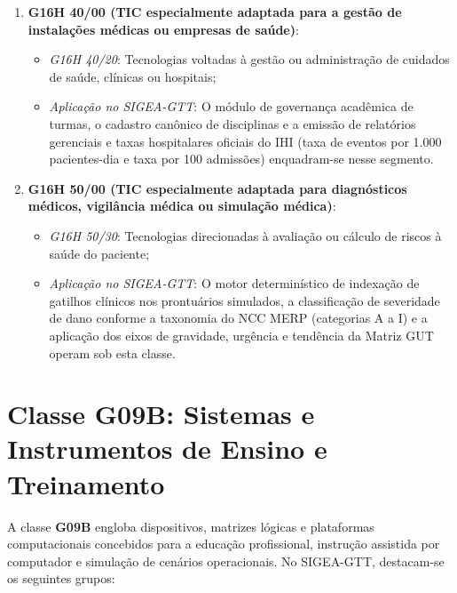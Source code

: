 \begin{enumerate}
    \item \textbf{G16H 40/00 (TIC especialmente adaptada para a gestão de instalações médicas ou empresas de saúde)}:
    \begin{itemize}
        \item \textit{G16H 40/20}: Tecnologias voltadas à gestão ou administração de cuidados de saúde, clínicas ou hospitais;
        \item \textit{Aplicação no SIGEA-GTT}: O módulo de governança acadêmica de turmas, o cadastro canônico de disciplinas e a emissão de relatórios gerenciais e taxas hospitalares oficiais do IHI (taxa de eventos por 1.000 pacientes-dia e taxa por 100 admissões) enquadram-se nesse segmento.
    \end{itemize}

    \item \textbf{G16H 50/00 (TIC especialmente adaptada para diagnósticos médicos, vigilância médica ou simulação médica)}:
    \begin{itemize}
        \item \textit{G16H 50/30}: Tecnologias direcionadas à avaliação ou cálculo de riscos à saúde do paciente;
        \item \textit{Aplicação no SIGEA-GTT}: O motor determinístico de indexação de gatilhos clínicos nos prontuários simulados, a classificação de severidade de dano conforme a taxonomia do NCC MERP (categorias A a I) e a aplicação dos eixos de gravidade, urgência e tendência da Matriz GUT operam sob esta classe.
    \end{itemize}
\end{enumerate}

\section{Classe G09B: Sistemas e Instrumentos de Ensino e Treinamento}
\label{sec_classe_g09b}

A classe \textbf{G09B} engloba dispositivos, matrizes lógicas e plataformas computacionais concebidos para a educação profissional, instrução assistida por computador e simulação de cenários operacionais. No SIGEA-GTT, destacam-se os seguintes grupos:

